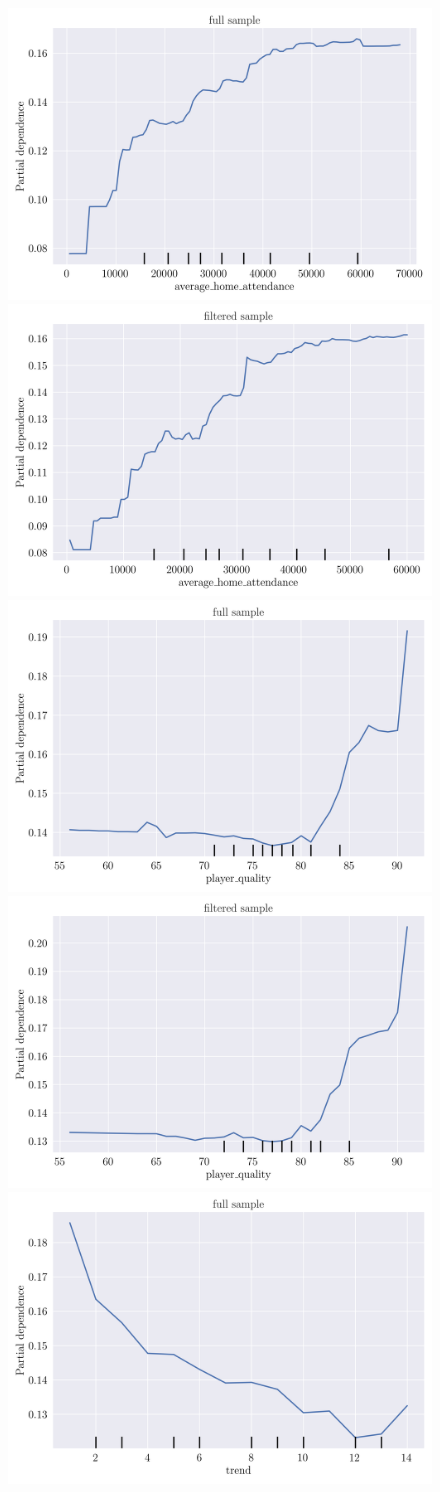 \begin{figure}
    \centering
    \includegraphics[width=0.49\linewidth]{attachments/machine-learning/pd_aha_rf_full_sample.png}
    \includegraphics[width=0.49\linewidth]{attachments/machine-learning/pd_aha_rf_filtered_sample.png}
    \includegraphics[width=0.49\linewidth]{attachments/machine-learning/pd_pr_rf_full_sample.png}
    \includegraphics[width=0.49\linewidth]{attachments/machine-learning/pd_pr_rf_filtered_sample.png}
    \includegraphics[width=0.49\linewidth]{attachments/machine-learning/pd_trend_rf_full_sample.png}

\end{figure}
